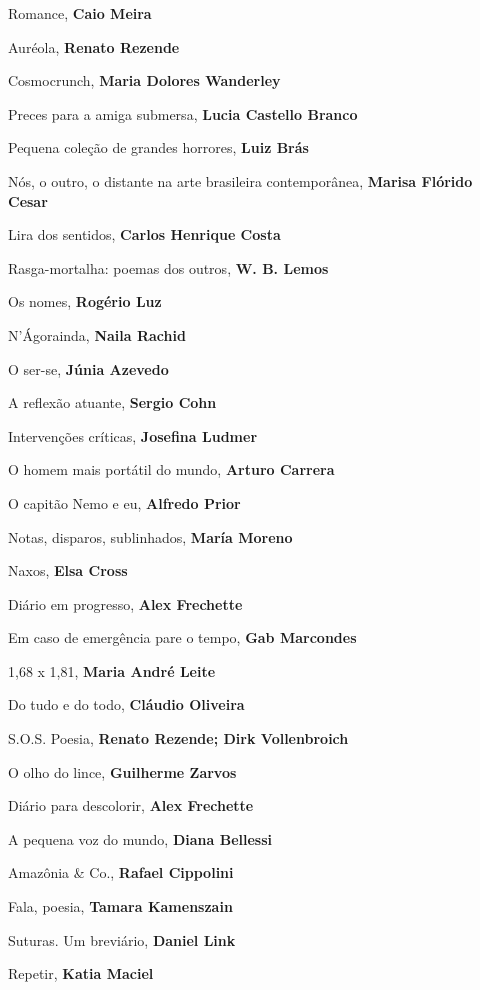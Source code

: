 \begin{multicols}{2}
\begin{enumerate}
{\item Romance, \textbf{Caio Meira}
\item Auréola, \textbf{Renato Rezende}
\item Cosmocrunch, \textbf{Maria Dolores Wanderley}
\item Preces para a amiga submersa, \textbf{Lucia Castello Branco}
\item Pequena coleção de grandes horrores, \textbf{Luiz Brás}
\item Nós, o outro, o distante na arte brasileira contemporânea, \textbf{Marisa Flórido Cesar}
\item Lira dos sentidos, \textbf{Carlos Henrique Costa}
\item Rasga-mortalha: poemas dos outros, \textbf{W. B. Lemos}
\item Os nomes, \textbf{Rogério Luz}
\item N’Ágorainda, \textbf{Naila Rachid}
\item O ser-se, \textbf{Júnia Azevedo}
\item A reflexão atuante, \textbf{Sergio Cohn}
\item Intervenções críticas, \textbf{Josefina Ludmer}
\item O homem mais portátil do mundo, \textbf{Arturo Carrera}
\item O capitão Nemo e eu, \textbf{Alfredo Prior}
\item Notas, disparos, sublinhados, \textbf{María Moreno}
\item Naxos, \textbf{Elsa Cross}
\item Diário em progresso, \textbf{Alex Frechette}
\item Em caso de emergência pare o tempo, \textbf{Gab Marcondes}
\item 1,68 x 1,81, \textbf{Maria André Leite}
\item Do tudo e do todo, \textbf{Cláudio Oliveira}
\item S.O.S. Poesia, \textbf{Renato Rezende; Dirk Vollenbroich}
\item O olho do lince, \textbf{Guilherme Zarvos}
\item Diário para descolorir, \textbf{Alex Frechette}
\item A pequena voz do mundo, \textbf{Diana Bellessi}
\item Amazônia \& Co., \textbf{Rafael Cippolini}
\item Fala, poesia, \textbf{Tamara Kamenszain}
\item Suturas. Um breviário, \textbf{Daniel Link}
\item Repetir, \textbf{Katia Maciel}
}
\end{enumerate}
\end{multicols}
